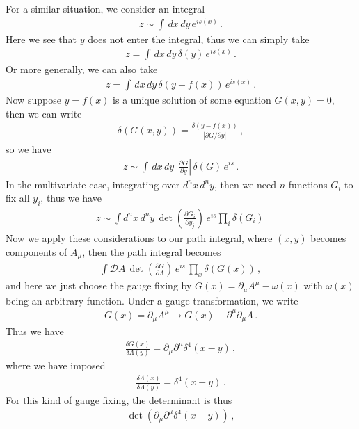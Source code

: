 \documentclass[11pt, onesided]{book}
\theoremstyle{break}
\theoremstyle{break}
\newcommand{\pd}{\partial}
\begin{document}
For a similar situation, we consider an integral
\begin{align*}
z \sim \int \, dx\, dy\, e^{is(x)}\,.
\end{align*}
Here we see that $y$ does not enter the integral, thus we can simply take
\begin{align*}
z = \int \, dx\, dy\, \delta(y)\, e^{is(x)}\,.
\end{align*}
Or more generally, we can also take
\begin{align*}
z =  \int \, dx\, dy\, \delta(y-f(x))\, e^{is(x)}\,.
\end{align*}
Now suppose $y = f(x)$ is a unique solution of some equation $G(x,y) = 0$, then we can write
\begin{align*}
\delta(G(x,y)) = \frac{\delta(y-f(x))}{|\pd G/\pd y|}\,,
\end{align*}
so we have
\begin{align*}
z \sim \int \, dx\, dy\, \left| \frac{\pd G}{\pd y}\right|\, \delta(G)\, e^{is}\,.
\end{align*}
In the multivariate case, integrating over $d^n x\, d^n y$, then we need $n$ functions $G_i$ to fix all $y_i$, thus we have
\begin{align*}
z \sim \int d^n x\, d^n y \, \det\left( \frac{\pd G_i}{\pd y_j}\right) \,e^{is} \prod_i \delta(G_i) \, 
\end{align*}
Now we apply these considerations to our path integral, where $(x,y)$ becomes components of $A_\mu$, then the path integral becomes
\begin{align*}
\int \mathcal{D}A \, \det\left( \frac{\pd G}{\pd \Lambda}\right)\,e^{is}\, \prod_x \delta(G(x))\,,
\end{align*}
and here we just choose the gauge fixing by $G(x) = \pd_\mu A^\mu -\omega(x)$ with $\omega(x)$ being an arbitrary function. Under a gauge transformation, we write
\begin{align*}
G(x) = \pd_\mu A^\mu \to G(x) - \pd^\mu \pd_\mu \Lambda\,.
\end{align*}
Thus we have
\begin{align*}
\frac{\delta G(x)}{\delta \Lambda(y)} = \pd_\mu \pd^\mu \delta^4(x-y)\,,
\end{align*}
where we have imposed
\begin{align*}
\frac{\delta \Lambda(x)}{\delta \Lambda (y)} = \delta^4(x-y)\,.
\end{align*}
For this kind of gauge fixing, the determinant is thus
\begin{align*}
\det(\pd_\mu \pd^\mu \delta^4(x-y))\,,
\end{align*}
\end{document}
